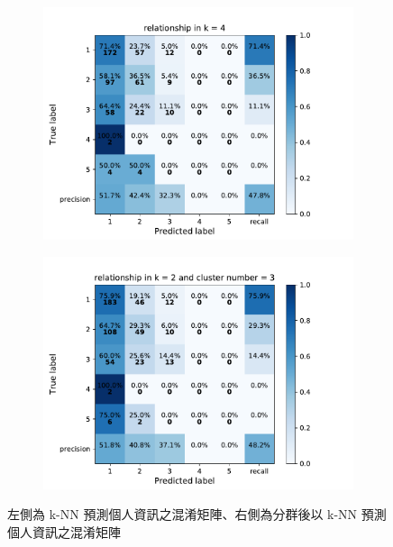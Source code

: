 {\begin{figure}[h]
    \centering
    \begin{subfigure}
      \centering
      \includegraphics[scale=0.45]{fig/super_knn_relationship.pdf}
    \end{subfigure}%
    \begin{subfigure}
      \centering
      \includegraphics[scale=0.45]{fig/kms_knn_relationship.pdf}
    \end{subfigure}
    \caption{左側為 k-NN 預測個人資訊之混淆矩陣、右側為分群後以 k-NN 預測個人資訊之混淆矩陣}
    \label{fig:knn_con}
\end{figure}

}

